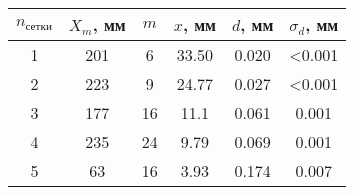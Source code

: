 \begin{tabular}{| c | c | c | c | c | c |}
    \hline
    $n_{сетки}$ & $X_m$, мм & $m$ & $x$, мм  & $d$, мм & $\sigma_d$, мм\\
    \hline
    1 & 201  & 6 & 33.50  &  0.020 & <0.001\\
    \hline
    2 & 223 & 9 & 24.77  &   0.027 & <0.001\\
    \hline
    3 & 177  & 16 & 11.1 &   0.061 & 0.001\\
    \hline
    4 & 235  & 24 & 9.79   &  0.069 & 0.001\\
    \hline
    5 & 63  & 16 & 3.93    &   0.174  & 0.007\\
    \hline
    \end{tabular}
    